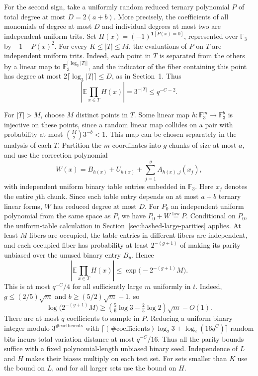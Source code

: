 \documentclass[11pt]{article}
\begin{document}
For the second sign, take a uniformly random reduced ternary
polynomial $P$ of total degree at most $D=2(a+b)$. More precisely,
the coefficients of all monomials of degree at most $D$ and
individual degrees at most two are independent uniform trits.
Set $H(x)=(-1)^{\mathbf1[P(x)=0]}$, represented over $\mathbb F_3$
by $-1-P(x)^2$. For every $K\le |T|\le M$, the evaluations of $P$
on $T$ are independent uniform trits. Indeed, each point in $T$ is
separated from the others by a linear map to
$\mathbb F_3^{\lceil\log_3 |T|\rceil}$, and the indicator of the
fiber containing this point has degree at most
$2\lceil\log_3 |T|\rceil\le D$, as in
Section~1. Thus
\[
  \left|\mathbb E\prod_{x\in T}H(x)\right|
   =3^{-|T|}\le q^{-C-2}.
\]

For $|T|>M$, choose $M$ distinct points in $T$. Some linear map
$h:\mathbb F_3^m\to\mathbb F_3^b$ is injective on these points,
since a random linear map collides on a pair with probability at
most $\binom M2 3^{-b}<1$. This map can be chosen separately in
the analysis of each $T$. Partition the $m$ coordinates into $g$
chunks of size at most $a$, and use the correction polynomial
\[
   W(x)= B_{h(x)}+U_{h(x)}+\sum_{j=1}^g A_{h(x),j}(x_j),
\]
with independent uniform binary table entries embedded in
$\mathbb F_3$. Here $x_j$ denotes the entire $j$th chunk. Since
each table entry depends on at most $a+b$ ternary linear forms,
$W$ has reduced degree at most $D$. For $P_0$ an independent
uniform polynomial from the same space as $P$, we have
$P_0+W\overset{\mathrm{law}}=P$. Conditional on $P_0$, the
uniform-table calculation in Section~\ref{sec:hashed-large-parities}
applies. At least $M$ fibers are occupied, the table entries in
different fibers are independent, and each occupied fiber has
probability at least $2^{-(g+1)}$ of making its parity unbiased
over the unused binary entry $B_y$. Hence
\[
   \left|\mathbb E\prod_{x\in T} H(x)\right|
       \le \exp\bigl(-2^{-(g+1)}M\bigr).
\]
This is at most $q^{-C}/4$ for all sufficiently large $m$ uniformly
in $t$. Indeed, $g\le(2/5)\sqrt m$ and
$b\ge(5/2)\sqrt m-1$, so
\[
 \log\bigl(2^{-(g+1)}M\bigr)
 \ge \left(\tfrac56\log 3-\tfrac25\log 2\right)\sqrt m-O(1).
\]
There are at most $q$ coefficients to sample in $P$. Reducing a
uniform binary integer modulo $3^{\#\mathrm{coefficients}}$
with $\lceil (\#\mathrm{coefficients})\log_2 3+
\log_2(16q^C)\rceil$ random bits incurs total variation distance at
most $q^{-C}/16$. Thus all the parity bounds suffice with a fixed
polynomial-length unbiased binary seed. Independence of $L$ and $H$
makes their biases multiply on each test set. For sets smaller than
$K$ use the bound on $L$, and for all larger sets use the bound on
$H$.
\end{document}
